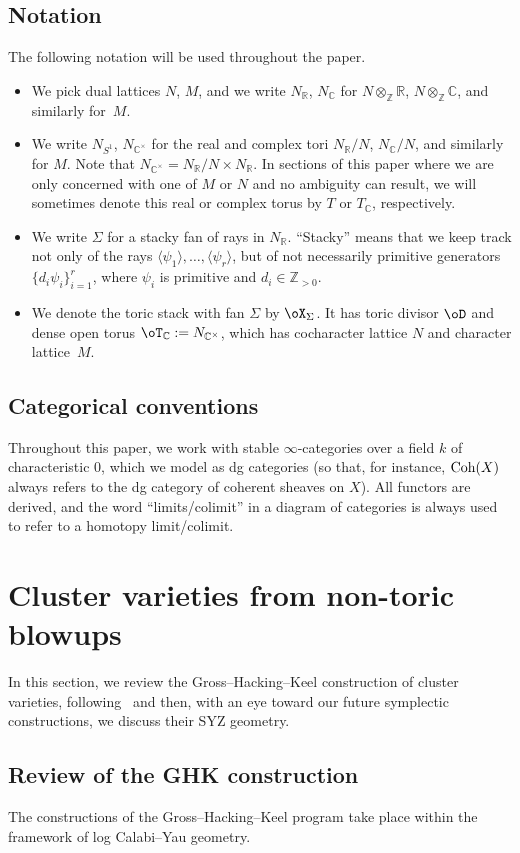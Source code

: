 \documentclass[10pt,a4paper]{amsart}
\numberwithin{equation}{section}
\def\CC{\mathbb{C}}
\def\RR{\mathbb{R}}
\def\ZZ{\mathbb{Z}}
\newcommand{\Coh}{\textup{Coh}}
\begin{document}
\subsection*{Notation}
The following notation will be used throughout the paper.
\begin{itemize}\itemsep=0pt
 \item We pick dual lattices $N$, $M$, and we write $N_\RR$, $N_\CC$ for $N\otimes_\ZZ\RR$, $N\otimes_\ZZ\CC$, and similarly for~$M$.
 \item We write $N_{S^1}$, $N_{\CC^\times}$ for the real and complex tori $N_\RR/N$, $N_\CC/N$, and similarly for $M$. Note that $N_{\CC^\times} = N_\RR/N\times N_\RR$. In sections of this paper where we are only concerned with one of $M$ or $N$ and no ambiguity can result, we will sometimes denote this real or complex torus by $T$ or $T_\CC$, respectively.
 \item We write $\Sigma$ for a stacky fan of rays in $N_\RR$. ``Stacky'' means that we keep track not only of the rays $\langle \psi_1\rangle, \dots, \langle \psi_r\rangle$, but of not necessarily primitive generators $\{d_i\psi_i\}_{i=1}^r$, where $\psi_i$ is primitive and $d_i\in \ZZ_{>0}$.
 \item We denote the toric stack with fan $\Sigma$ by $\oX_\Sigma$. It has toric divisor $\oD$ and dense open torus $\oT_{\CC} := N_{\CC^\times}$, which has cocharacter lattice $N$ and character lattice~$M$.
\end{itemize}

\subsection*{Categorical conventions}
Throughout this paper, we work with stable $\infty$-categories over a field $k$ of characteristic 0, which we model as dg categories (so that, for instance, $\Coh(X)$ always refers to the dg category of coherent sheaves on $X$). All functors are derived, and the word ``limits/colimit'' in a diagram of categories is always used to refer to a homotopy limit/colimit.

\section{Cluster varieties from non-toric blowups}\label{sec2}
In this section, we review the Gross--Hacking--Keel construction of cluster varieties, following~\cite{HK-icm} and then, with an eye toward our future symplectic constructions, we discuss their SYZ geometry.
\subsection{Review of the GHK construction}
The constructions of the Gross--Hacking--Keel program take place within the framework of log Calabi--Yau geometry.
\end{document}
